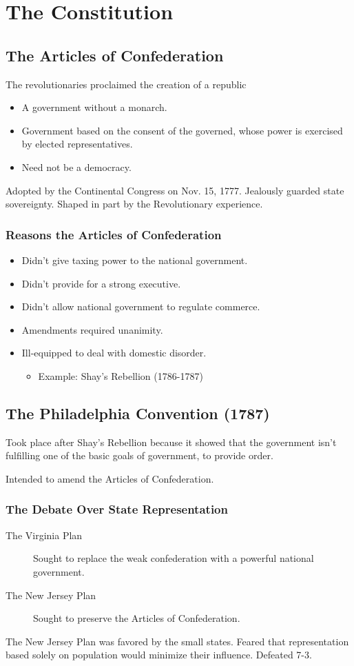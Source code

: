 \section{The Constitution}
\subsection{The Articles of Confederation}
The revolutionaries proclaimed the creation of a republic
\begin{itemize}
    \item A government without a monarch.
    \item Government based on the consent of the governed, whose power is exercised by elected representatives.
    \item Need not be a democracy.
\end{itemize}
Adopted by the Continental Congress on Nov. 15, 1777.
Jealously guarded state sovereignty.
Shaped in part by the Revolutionary experience.
\subsubsection{Reasons the Articles of Confederation}
\begin{itemize}
    \item Didn't give taxing power to the national government.
    \item Didn't provide for a strong executive.
    \item Didn't allow national government to regulate commerce.
    \item Amendments required unanimity.
    \item Ill-equipped to deal with domestic disorder.
    \begin{itemize}
        \item Example: Shay's Rebellion (1786-1787)
    \end{itemize}
\end{itemize}
\subsection{The Philadelphia Convention (1787)}
Took place after Shay's Rebellion because it showed that the government isn't fulfilling one of the basic goals of government, to provide order.

Intended to amend the Articles of Confederation.
\subsubsection{The Debate Over State Representation}
\begin{description}
    \item[The Virginia Plan] Sought to replace the weak confederation with a powerful national government.
    \item[The New Jersey Plan] Sought to preserve the Articles of Confederation.
\end{description}
The New Jersey Plan was favored by the small states. Feared that representation based solely on population would minimize their influence. Defeated 7-3.
